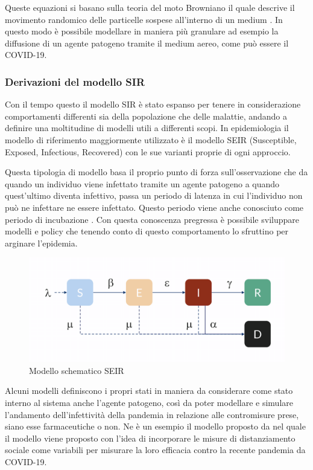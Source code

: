 Queste equazioni si basano sulla teoria del moto Browniano 
il quale descrive il movimento randomico delle particelle 
sospese all'interno di un medium \cite{wiki:Brownian_motion}. 
In questo modo è possibile modellare in maniera più granulare
ad esempio la diffusione di un agente patogeno tramite il 
medium aereo, come può essere il COVID-19.

\subsubsection{Derivazioni del modello SIR}

Con il tempo questo il modello SIR è stato espanso 
per tenere in considerazione comportamenti
differenti sia della popolazione che delle malattie, 
andando a definire una moltitudine di modelli utili a 
differenti scopi. In epidemiologia il modello di
riferimento maggiormente utilizzato è il modello SEIR 
(Susceptible, Exposed, Infectious, Recovered)
con le sue varianti proprie di ogni approccio.

Questa tipologia di modello basa il proprio punto di forza
sull'osservazione che da quando un individuo viene 
infettato tramite un agente patogeno a quando quest'ultimo 
diventa infettivo, passa un periodo di latenza in cui 
l'individuo non può ne infettare ne essere infettato. 
Questo periodo viene anche conosciuto come periodo di 
incubazione \cite{wiki:Incubation_period}. Con questa 
conoscenza pregressa è possibile sviluppare modelli 
e policy che tenendo conto di questo comportamento lo 
sfruttino per arginare l'epidemia.

\begin{figure}[h]
    \includegraphics[width=\linewidth]{img/SEIR-compartmental-model-schematic.png}
    \caption{Modello schematico SEIR} 
    \label{fig:SEIR_model}
\end{figure}

Alcuni modelli definiscono i propri stati in maniera da considerare 
come stato interno al sistema anche l'agente patogeno, così da 
poter modellare e simulare l'andamento dell'infettività della pandemia 
in relazione alle contromisure prese, siano esse farmaceutiche o non.
Ne è un esempio il modello proposto da \cite{Mwalili2020} nel quale 
il modello viene proposto con l'idea di incorporare le misure di 
distanziamento sociale come variabili per misurare la loro efficacia
contro la recente pandemia da COVID-19.

